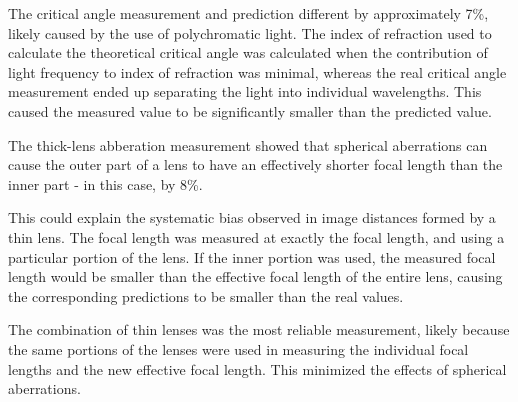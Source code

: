 \documentclass[journal]{IEEEtran}
\begin{document}
The critical angle measurement and prediction different by approximately 7\%,
likely caused by the use of polychromatic light. The index of refraction used
to calculate the theoretical critical angle was calculated when the
contribution of light frequency to index of refraction was minimal, whereas the
real critical angle measurement ended up separating the light into individual
wavelengths. This caused the measured value to be significantly smaller than
the predicted value.

The thick-lens abberation measurement showed that spherical aberrations can
cause the outer part of a lens to have an effectively shorter focal length than
the inner part - in this case, by 8\%.

This could explain the systematic bias observed in image distances formed by a
thin lens. The focal length was measured at exactly the focal length, and using
a particular portion of the lens. If the inner portion was used, the measured
focal length would be smaller than the effective focal length of the entire
lens, causing the corresponding predictions to be smaller than the real values. 

The combination of thin lenses was the most reliable measurement, likely
because the same portions of the lenses were used in measuring the individual
focal lengths and the new effective focal length. This minimized the effects of
spherical aberrations.
\end{document}
